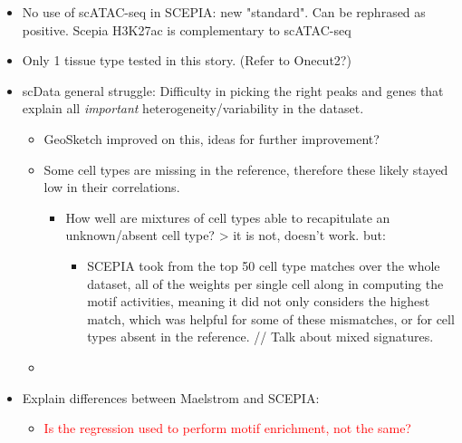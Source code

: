\begin{itemize}
    \item No use of scATAC-seq in SCEPIA: new "standard". Can be rephrased as positive. Scepia H3K27ac is complementary to scATAC-seq
    \item Only 1 tissue type tested in this story. (Refer to Onecut2?)
    \item scData general struggle: Difficulty in picking the right peaks and genes that explain all \textit{important} heterogeneity/variability in the dataset.
    \begin{itemize}
        \item GeoSketch improved on this, ideas for further improvement?
        \item Some cell types are missing in the reference, therefore these likely stayed low in their correlations.
        \begin{itemize}
            \item How well are mixtures of cell types able to recapitulate an unknown/absent cell type? > it is not, doesn't work. but: 
            \begin{itemize}
                \item SCEPIA took from the top 50 cell type matches over the whole dataset, all of the weights per single cell along in computing the motif activities, meaning it did not only considers the highest match, which was helpful for some of these mismatches, or for cell types absent in the reference. // Talk about mixed signatures.
            \end{itemize}


        \end{itemize}
        \item \end{itemize}

        \item Explain differences between Maelstrom and SCEPIA: 
        \begin{itemize}
            \item \textcolor{red}{Is the regression used to perform motif enrichment, not the same?}
        \end{itemize}
\end{itemize}


